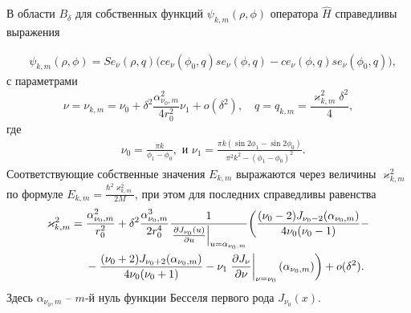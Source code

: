 \begin{theorem}
В области  $B_\delta$ для собственных функций $\psi_{k, m}(\rho, \phi)$ оператора $\hat{H}$ справедливы выражения

\begin{align}
&\psi_{k, m}(\rho, \phi) = 
    Se_\nu(\rho, q) \biggl( ce_\nu(\phi_0, q) se_\nu(\phi, q) -ce_\nu(\phi, q) se_\nu(\phi_0, q) \biggr) ,  \label{eq:funB}
\end{align}
с параметрами
\begin{equation*}    
\nu = \nu_{k,m} = \nu_0 +\delta^2 \frac{\alpha_{\nu_0, m}^2}{4 r_0^2} \nu_1 + o(\delta^2), \quad q=q_{k,m} = \frac{\varkappa_{k,m}^2 \delta^2}{4},
\end{equation*}
где
\begin{align*}
& \nu_0 = \frac{\pi k}{\phi_1-\phi_0},\text{\ \ и \ \ }
\nu_1= \frac{\pi k (\sin 2\phi_1 - \sin 2 \phi_0)}{\pi^2k^2-(\phi_1-\phi_0)^2} .
\end{align*}
Соответствующие собственные значения $E_{k, m}$ выражаются через величины $\varkappa^2_{k, m}$ по формуле $E_{k, m} =  \frac{\hbar^2 \varkappa^2_{k, m}}{2M}$, при этом для последних  справедливы равенства
\begin{align}
\varkappa_{k, m}^2 ={}& \frac{\alpha_{\nu_0, m}^2}{r_0^2} +  \delta^2 \frac{\alpha_{\nu_0, m}^3}{2 r_0^4}\frac{1}{ \left.\frac{\partial J_{\nu_0}(u)}{\partial u}\right|_{u=\alpha_{\nu_0, m}} }  
 \biggl(\frac{(\nu_0 - 2)J_{\nu_0-2}(\alpha_{\nu_0, m})   }{4\nu_0 (\nu_0-1)} -
\notag \\ 
&{}- \frac{(\nu_0 + 2)J_{\nu_0+2}(\alpha_{\nu_0, m})}{4\nu_0 (\nu_0+1)} 
- \nu_1 \left.\frac{\partial J_\nu}{\partial \nu}\right|_{\nu = \nu_0}(\alpha_{\nu_0, m})
    \biggr) + o(\delta^2).\label{eq:valB}
\end{align}
Здесь $\alpha_{\nu_0,m}$ -- $m$-й нуль функции Бесселя первого рода $J_{\nu_0}(x)$.
\end{theorem}
